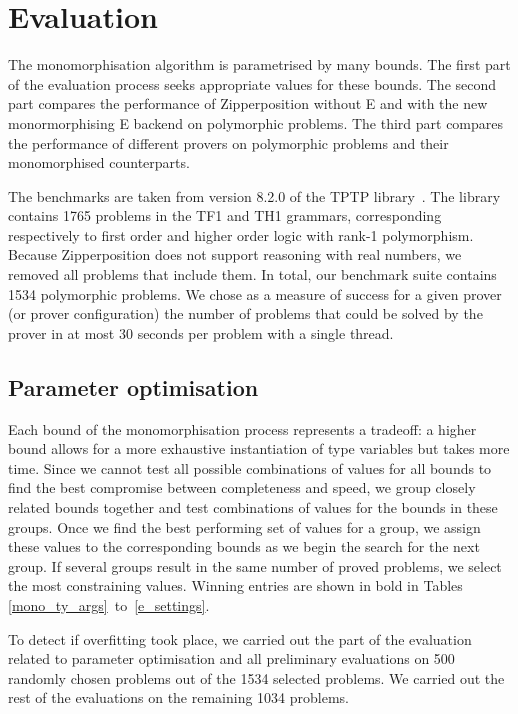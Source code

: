 \documentclass[runningheads]{llncs}
\begin{document}
\section{Evaluation}
\label{sec:evaluation}

The monomorphisation algorithm is parametrised by many bounds. The first part of the evaluation process seeks appropriate values for these bounds. The second part compares the performance of Zipperposition without E and with the new monormorphising E backend on polymorphic problems. The third part compares the performance of different provers on polymorphic problems and their monomorphised counterparts.

The benchmarks are taken from version 8.2.0 of the TPTP library~\cite{tptp}. The library contains 1765 problems in the TF1 and TH1 grammars, corresponding respectively to first order and higher order logic with rank-1 polymorphism. Because Zipperposition does not support reasoning with real numbers, we removed all problems that include them. In total, our benchmark suite contains 1534 polymorphic problems. We chose as a measure of success for a given prover (or prover configuration) the number of problems
that could be solved by the prover in at most 30 seconds
per problem with a single thread.



\subsection{Parameter optimisation}
\label{param_opti}

Each bound of the monomorphisation process represents a tradeoff: a higher bound allows for a more exhaustive instantiation of type variables but takes more time. Since we cannot test all possible combinations of values for all bounds to find the best compromise between completeness and speed,
we group closely related bounds together and test combinations of values for the bounds in these groups. Once we find the best performing set of values for a group, we assign these values to the corresponding bounds as we begin the search for the next group. If several groups result in the same number of proved problems, we select the most constraining values. Winning entries are shown in bold in Tables \ref{mono_ty_args}~to~\ref{e_settings}.

To detect if overfitting took place, we carried out the part of the evaluation related to parameter optimisation and all preliminary evaluations on 500 randomly chosen problems out of the 1534 selected problems. We carried out the rest of the evaluations on the remaining 1034 problems.
\end{document}
